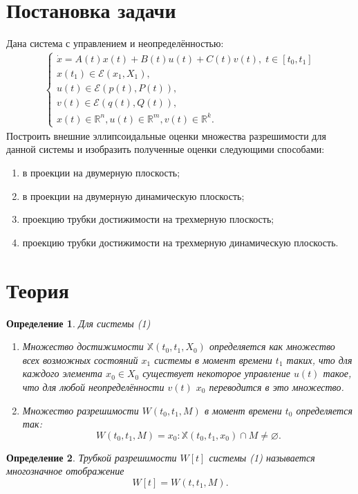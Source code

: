 \documentclass[12pt]{article}
\theoremstyle{rusdef}
\newtheorem{definition}{Определение}
\newcommand{\R}{\ensuremath{\mathbb{R}}} %
\newcommand{\E}{\ensuremath{\mathcal{E}}} %
\begin{document}
\section{Постановка задачи}
Дана система с управлением и неопределённостью:
\begin{gather}
\left\{
\begin{aligned}
\dot{x} = A(t)x(t) + B(t)u(t) + C(t)v(t), \; t \in [t_0, t_1] \\
x(t_1) \in \E(x_1, X_1), \\
u(t) \in \E(p(t), P(t)), \\
v(t) \in \E(q(t), Q(t)), \\
x(t) \in \R^n, u(t) \in \R^m, v(t) \in \R^k.
\end{aligned}
\right.
\end{gather}
Построить внешние эллипсоидальные оценки множества разрешимости для данной системы и изобразить полученные оценки следующими способами:
\begin{enumerate}
\item в проекции на двумерную плоскость;
\item в проекции на двумерную динамическую плоскость;
\item проекцию трубки достижимости на трехмерную плоскость;
\item проекцию трубки достижимости на трехмерную динамическую плоскость.
\end{enumerate}

\section{Теория}
\begin{definition}
Для системы (1)
\begin{enumerate}
\item Множество достижимости $\mathbb{X}(t_0 , t_1 , X_0 )$ определяется как множество всех возможных состояний $x_1$ системы в момент времени $t_1$ таких, что для каждого элемента $x_0 \in X_0$ существует некоторое управление $u(t)$ такое, что для любой неопределённости $v(t)$ $x_0$ переводится в это множество.
\item Множество разрешимости $W(t_0 , t_1 , M)$ в момент времени $t_0$ определяется так:
$$
W(t_0 , t_1 , M) = {x_0 : \mathbb{X}(t_0, t_1, x_0) \cap M \neq \varnothing}.
$$
\end{enumerate}
\end{definition}

\begin{definition}
Трубкой разрешимости $W[t]$ системы (1) называется многозначное отображение
$$
W[t] = W(t, t_1, M).
$$
\end{definition}
\end{document}
